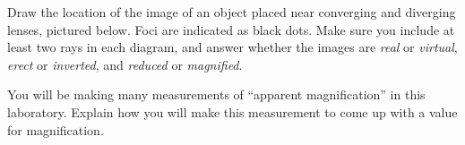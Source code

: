 \documentclass[addpoints]{physlabs}
\date{\today}
\begin{document}
\maketitle

\begin{prelab}

    \filbreak
    \question[1] Draw the location of the image of an object placed near converging and diverging lenses, pictured below. Foci are indicated as black dots. Make sure you include at least two rays in each diagram, and answer whether the images are \textsl{real} or \textsl{virtual}, \textsl{erect} or \textsl{inverted}, and \textsl{reduced} or \textsl{magnified}.
    \begin{figure}[ht]
        \centering
        
    \end{figure}
    \begin{solution}[3cm]
        
    \end{solution}

    \filbreak
    \question[1] You will be making many measurements of ``apparent magnification'' in this laboratory. Explain how you will make this measurement to come up with a value for magnification.
    \begin{solution}[3cm]
        
    \end{solution}

\end{prelab}
\end{document}
